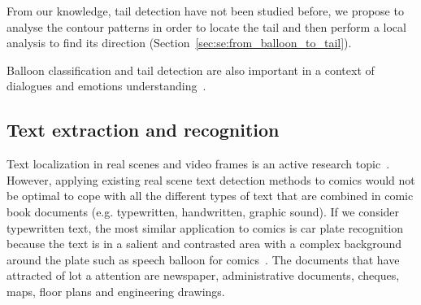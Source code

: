 From our knowledge, tail detection have not been studied before, we propose to analyse the contour patterns in order to locate the tail and then perform a local analysis to find its direction (Section~\ref{sec:se:from_balloon_to_tail}).

Balloon classification and tail detection are also important in a context of dialogues and emotions understanding~\cite{millidge2009comic}.









\subsection{Text extraction and recognition}
\label{sec:sota:text}


Text localization in real scenes and video frames is an active research topic~\cite{Jung04,ShahabICDAR2011Robust,KaratzasICDAR2013Robust}.
However, applying existing real scene text detection methods to comics would not be optimal to cope with all the different types of text that are combined in comic book documents (e.g. typewritten, handwritten, graphic sound).
If we consider typewritten text, the most similar application to comics is car plate recognition because the text is in a salient and contrasted area with a complex background around the plate such as speech balloon for comics~\cite{anagnostopoulos2008license}.
The documents that have attracted of lot a attention are newspaper, administrative documents, cheques, maps, floor plans and engineering drawings.


